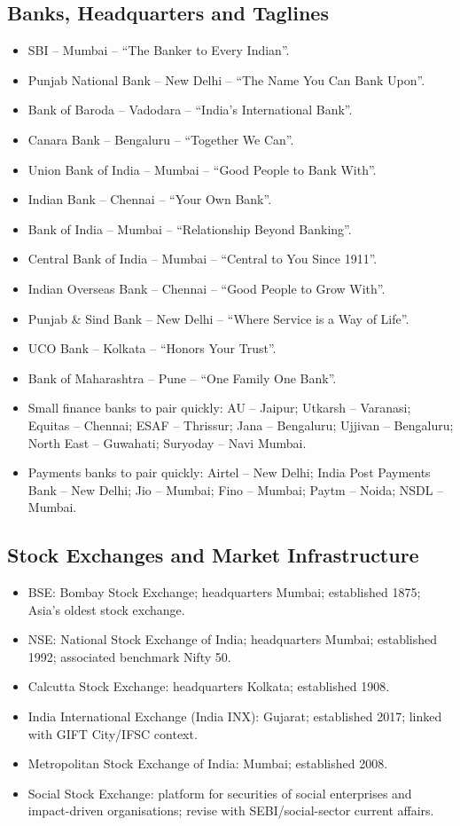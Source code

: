 \documentclass[10pt,a4paper]{article}
\begin{document}
\subsection{Banks, Headquarters and Taglines}
\begin{itemize}
    \item SBI -- Mumbai -- ``The Banker to Every Indian''.
    \item Punjab National Bank -- New Delhi -- ``The Name You Can Bank Upon''.
    \item Bank of Baroda -- Vadodara -- ``India's International Bank''.
    \item Canara Bank -- Bengaluru -- ``Together We Can''.
    \item Union Bank of India -- Mumbai -- ``Good People to Bank With''.
    \item Indian Bank -- Chennai -- ``Your Own Bank''.
    \item Bank of India -- Mumbai -- ``Relationship Beyond Banking''.
    \item Central Bank of India -- Mumbai -- ``Central to You Since 1911''.
    \item Indian Overseas Bank -- Chennai -- ``Good People to Grow With''.
    \item Punjab \& Sind Bank -- New Delhi -- ``Where Service is a Way of Life''.
    \item UCO Bank -- Kolkata -- ``Honors Your Trust''.
    \item Bank of Maharashtra -- Pune -- ``One Family One Bank''.
    \item Small finance banks to pair quickly: AU -- Jaipur; Utkarsh -- Varanasi; Equitas -- Chennai; ESAF -- Thrissur; Jana -- Bengaluru; Ujjivan -- Bengaluru; North East -- Guwahati; Suryoday -- Navi Mumbai.
    \item Payments banks to pair quickly: Airtel -- New Delhi; India Post Payments Bank -- New Delhi; Jio -- Mumbai; Fino -- Mumbai; Paytm -- Noida; NSDL -- Mumbai.
\end{itemize}

\subsection{Stock Exchanges and Market Infrastructure}
\begin{itemize}
    \item BSE: Bombay Stock Exchange; headquarters Mumbai; established 1875; Asia's oldest stock exchange.
    \item NSE: National Stock Exchange of India; headquarters Mumbai; established 1992; associated benchmark Nifty 50.
    \item Calcutta Stock Exchange: headquarters Kolkata; established 1908.
    \item India International Exchange (India INX): Gujarat; established 2017; linked with GIFT City/IFSC context.
    \item Metropolitan Stock Exchange of India: Mumbai; established 2008.
    \item Social Stock Exchange: platform for securities of social enterprises and impact-driven organisations; revise with SEBI/social-sector current affairs.
\end{itemize}
\end{document}
